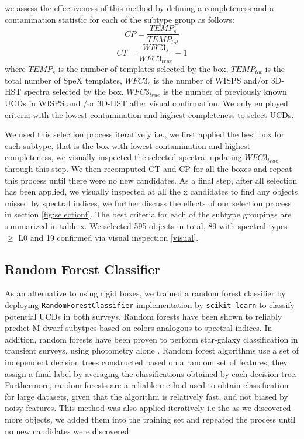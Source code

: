\documentclass[manuscript]{aastex}
\begin{document}
we assess the effectiveness of this method by defining a completeness and a contamination statistic for each of the subtype group  as follows: 
 \begin{equation} CP=\frac{TEMP_s}{TEMP_{tot}} \end{equation}
\begin{equation} CT= \frac{WFC3_s}{WFC3_{true}} -1 \end{equation} where $TEMP_s$ is the number of templates selected by the box, $TEMP_{tot}$ is the total number of SpeX templates, $WFC3_s$ is the number of WISPS and/or 3D-HST spectra selected by the box, $WFC3_{true}$  is the number of previously known UCDs in WISPS and /or 3D-HST after visual confirmation. We only employed criteria with the lowest contamination and highest completeness to select UCDs.

We used this selection process iteratively i.e., we first applied the best box for each subtype, that is the box with lowest contamination and highest completeness, we visually inspected the selected spectra, updating $WFC3_{true}$ through this step. We then recomputed CT and CP for all the boxes and repeat this process until there were no new candidates. As a final step, after all selection has been applied, we visually inspected at all the x candidates to find any objects missed by spectral indices, we further discuss the effects of our selection process in section \ref{fig:selectionf}. The best criteria for each of the subtype groupings are summarized in table x. We selected 595 objects in total, 89 with spectral types $\geq$ L0 and 19 confirmed via visual inspection \ref{visual}.


\subsection{Random Forest Classifier}
As an alternative to using rigid boxes, we trained a random forest classifier by deploying \texttt{RandomForestClassifier} implementation by \texttt{scikit-learn} \citep{2012arXiv1201.0490P} to classify potential UCDs in both surveys. Random forests have been shown to reliably predict M-dwarf subytpes based on colors \citep{2019arXiv190505900H} analogous to spectral indices. In addition, random forests have been proven to perform star-galaxy classification in transient surveys, using photometry alone \citep{2017AJ....153...73M}. Random forest algorithms use a set of independent decision trees constructed based on a random set of features, they assign a final label by averaging the classifications obtained by each decision tree. Furthermore, random forests are a reliable method used to obtain classification for large datasets, given that the algorithm is relatively fast, and not biased by noisy features. This method was also applied iteratively i.e the as we discovered more objects, we added them into the training set and repeated the process until no new candidates were discovered. 
\end{document}

